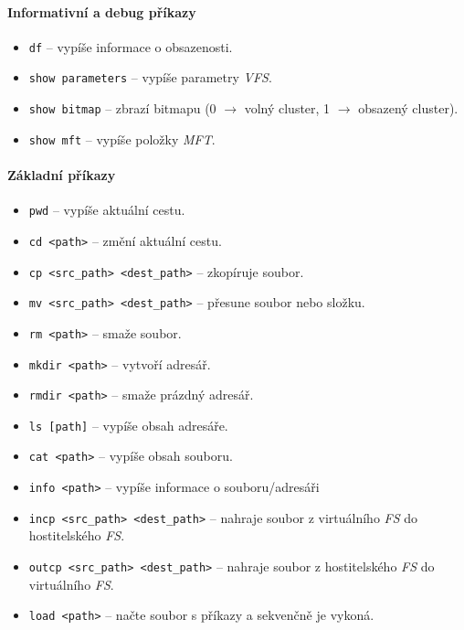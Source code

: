 \documentclass[12pt, a4paper]{report}
\begin{document}
\paragraph{Informativní a debug příkazy}
\begin{itemize}
	\item \verb|df| -- vypíše informace o obsazenosti.
	\item \verb|show parameters| -- vypíše parametry \emph{VFS}.
	\item \verb|show bitmap| -- zbrazí bitmapu (0 $\rightarrow$ volný cluster, 1 $\rightarrow$ obsazený cluster).
	\item \verb|show mft| -- vypíše položky \emph{MFT}.
\end{itemize}

\paragraph{Základní příkazy}
\begin{itemize}
	\item \verb|pwd| -- vypíše aktuální cestu.
	\item \verb|cd <path>| -- změní aktuální cestu.
	\item \verb|cp <src_path> <dest_path>| -- zkopíruje soubor.
	\item \verb|mv <src_path> <dest_path>| -- přesune soubor nebo složku.
	\item \verb|rm <path>| -- smaže soubor.
	\item \verb|mkdir <path>| -- vytvoří adresář.
	\item \verb|rmdir <path>| -- smaže prázdný adresář.
	\item \verb|ls [path]| -- vypíše obsah adresáře.
	\item \verb|cat <path>| -- vypíše obsah souboru.
	\item \verb|info <path>| -- vypíše informace o souboru/adresáři
	\item \verb|incp <src_path> <dest_path>| -- nahraje soubor z virtuálního \emph{FS} do hostitelského \emph{FS}.
	\item \verb|outcp <src_path> <dest_path>| -- nahraje soubor z hostitelského \emph{FS} do virtuálního \emph{FS}.
	\item \verb|load <path>| -- načte soubor s příkazy a sekvenčně je vykoná.
\end{itemize}
\end{document}
